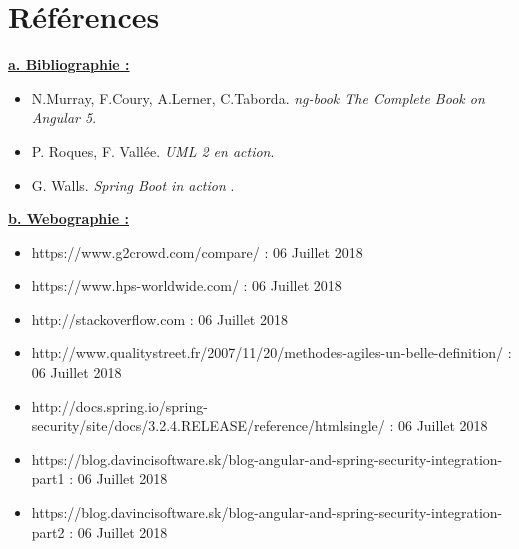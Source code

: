 \chapter*{Références}
\textbf{\underline{a. Bibliographie :}} 
\begin{itemize}

\item N.Murray, F.Coury, A.Lerner, C.Taborda. \textit{ng-book The Complete Book on Angular 5}.
\item P. Roques, F. Vallée. \textit{UML 2 en action}.
\item G. Walls. \textit{Spring Boot in action }.
\end{itemize}

\hrulefill

\textbf{ \underline{b. Webographie :} } 
\begin{itemize}
\item{https://www.g2crowd.com/compare/ : 06 Juillet 2018}
\item{https://www.hps-worldwide.com/ : 06 Juillet 2018}
\item{http://stackoverflow.com : 06 Juillet 2018}
\item{http://www.qualitystreet.fr/2007/11/20/methodes-agiles-un-belle-definition/ : 06 Juillet 2018}
\item{http://docs.spring.io/spring-security/site/docs/3.2.4.RELEASE/reference/htmlsingle/ : 06 Juillet 2018}
\item{https://blog.davincisoftware.sk/blog-angular-and-spring-security-integration-part1 : 06 Juillet 2018}
\item{https://blog.davincisoftware.sk/blog-angular-and-spring-security-integration-part2 : 06 Juillet 2018}
\end{itemize}


\hrulefill

%




